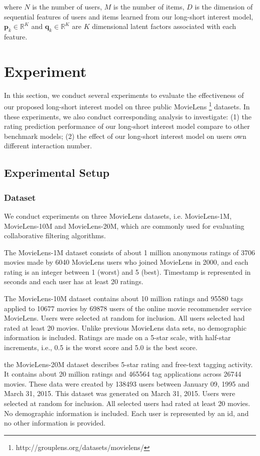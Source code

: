 \documentclass{llncs}
\begin{document}
where $N$ is the number of users, $M$ is the number of items,
$D$ is the dimension of sequential features of users and items learned from
our long-short interest model,
$\mathbf{p}_{k} \in \mathbb{R}^K$ and $\mathbf{q}_{k} \in \mathbb{R}^K$
are $K$ dimensional latent factors associated with each feature.

\section{Experiment}
In this section, we conduct several experiments to evaluate the effectiveness
of our proposed long-short interest model on three public
MovieLens \footnote{http://grouplens.org/datasets/movielens/} datasets.
In these experiments, we also conduct corresponding analysis to investigate:
(1) the rating prediction performance of our long-short interest model
compare to other benchmark models;
(2) the effect of our long-short interest model on users own different interaction number.

\subsection{Experimental Setup}
\subsubsection{Dataset}
We conduct experiments on three MovieLens datasets, i.e. MovieLens-1M,
MovieLens-10M and MovieLens-20M, which are commonly used for evaluating
collaborative filtering algorithms.

The MovieLens-1M dataset consists of about 1 million anonymous ratings of 3706 movies
made by 6040 MovieLens users who joined MovieLens in 2000,
and each rating is an integer between 1 (worst) and 5 (best).
Timestamp is represented in seconds and each user has at least 20 ratings.

The MovieLens-10M dataset contains about 10 million ratings and 95580 tags
applied to 10677 movies by 69878 users of the online movie recommender service MovieLens.
Users were selected at random for inclusion. All users selected had rated
at least 20 movies. Unlike previous MovieLens data sets, no demographic information is included.
Ratings are made on a 5-star scale, with half-star increments, i.e., 0.5 is the worst score
and 5.0 is the best score.

the MovieLens-20M dataset describes 5-star rating and free-text tagging activity.
It contains about 20 million ratings and 465564 tag applications across 26744 movies.
These data were created by 138493 users between January 09, 1995 and March 31, 2015.
This dataset was generated on March 31, 2015.
Users were selected at random for inclusion. All selected users had rated
at least 20 movies. No demographic information is included.
Each user is represented by an id, and no other information is provided.
\end{document}
